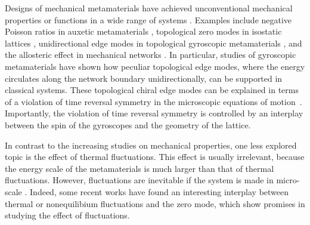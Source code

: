 \documentclass[
 preprint,
 preprintnumbers,
 amsmath,amssymb,
 aps,
 pre,
 longbibliography,
 10pt, twocolumn
]{revtex4-1}
\begin{document}
Designs of mechanical metamaterials have achieved unconventional mechanical properties or functions in a wide range of systems \cite{Bertoldi2017FlexibleMetamaterials}. Examples include negative Poisson ratios in auxetic metamaterials \cite{Lakes2017Negative-Poissons-RatioSolids,Ren2018AuxeticReview}, topological zero modes in isostatic lattices \cite{Kane2013TopologicalLattices,Lubensky2015PhononsLattices,Paulose2015SelectiveMetamaterials.}, unidirectional edge modes in topological gyroscopic metamaterials \cite{Nash2015TopologicalMetamaterials,Wang2015TopologicalWaves,Mitchell2018AmorphousSets}, and the allosteric effect in mechanical networks \cite{Rocks2017DesigningNetworks.,Yan2017ArchitectureMaterials.,Flechsig2017DesignProteins}. In particular, studies of gyroscopic metamaterials have shown how peculiar topological edge modes, where the energy circulates along the network boundary unidirectionally, can be supported in classical systems\cite{Nash2015TopologicalMetamaterials}. These topological chiral edge modes can be explained in terms of a violation of time reversal symmetry in the microscopic equations of motion~\cite{Nash2015TopologicalMetamaterials,Mitchell2018AmorphousSets}. Importantly, the violation of time reversal symmetry is controlled by an interplay between the spin of the gyroscopes and the geometry of the lattice. %




In contrast to the increasing studies on mechanical properties, one less explored topic is the effect of thermal fluctuations. This effect is usually irrelevant, because the energy scale of the metamaterials is much larger than that of thermal fluctuations. However, fluctuations are inevitable if the system is made in micro-scale \cite{Blees2015GrapheneKirigami}. 
Indeed, some recent works have found an interesting interplay between thermal \cite{Rocklin2018FoldingTemperature,Pedro2018TopologicalInteractions} or nonequilibium \cite{Woodhouse2018AutonomousEquilibrium} fluctuations and the zero mode, which show promises in studying the effect of fluctuations. 
\end{document}
